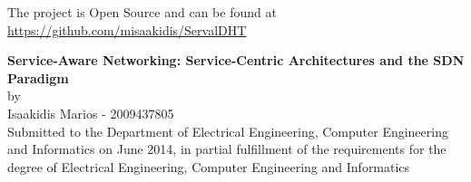 \documentclass[12pt,a4paper,oneside]{article}
\begin{document}
\noindent The project is Open Source and can be found at\\ 
\noindent \href{https://github.com/misaakidis/ServalDHT}{https://github.com/misaakidis/ServalDHT}


\newpage
\thispagestyle{empty}
\tableofcontents



\newpage
\pagestyle{plain}
\setcounter{page}{1}

\renewcommand{\nomname}{Abbreviations}
{}
\printnomenclature


\newpage
\begin{center}
{\large {\bf  Service-Aware Networking: Service-Centric Architectures and the SDN Paradigm}\\[0.5cm] by \\[0.5cm] Isaakidis Marios - 2009437805}
 ~\\[0.5cm]
Submitted to the Department of Electrical Engineering, Computer Engineering and Informatics on June 2014, in partial fulfillment of the requirements for the degree of Electrical Engineering, Computer Engineering and Informatics
\end{center}

\vfill
\end{document}
